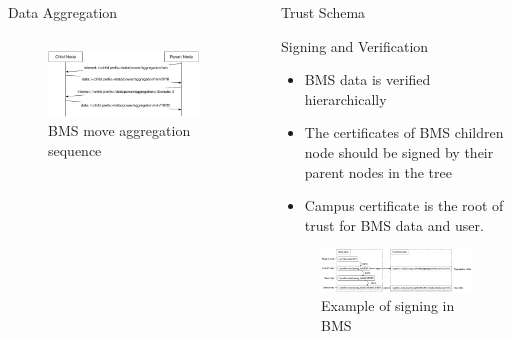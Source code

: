 \documentclass[final,hyperref={pdfpagelabels=false},20pt]{beamer}
\begin{document}
\begin{frame}[t]
\begin{columns}[t]
\begin{column}{.465\textwidth}
\begin{block}{Data Aggregation}
\begin{columns}[T]
\begin{column}{.56\textwidth}
\begin{figure}
\includegraphics[width=\linewidth]{bms-move-aggregate-sequence}
\caption{BMS move aggregation sequence}
\label{fig:move-aggregation}
\end{figure}
\end{column}

\end{columns}

\end{block}

\end{column} %

\begin{column}{.02\textwidth}\end{column} %
 
\begin{column}{.465\textwidth} %


\begin{block}{Trust Schema}

Signing and Verification

\begin{itemize}
\item{BMS data is verified hierarchically}
\item{The certificates of BMS children node should be signed by their parent nodes in the tree}
\item{Campus certificate is the root of trust for BMS data and user.}
\end{itemize}

\begin{figure}
\includegraphics[width=0.95\linewidth]{bms-signing-verification}
\caption{Example of signing in BMS}
\label{fig:bms-signing-example}
\end{figure}


\end{block}
\end{column}
\end{columns}
\end{frame}
\end{document}
